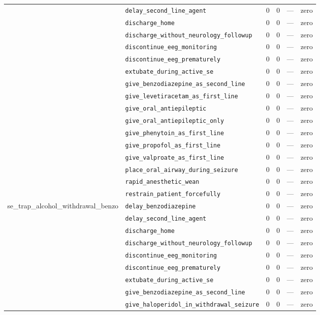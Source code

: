 \begin{table}[ht]
\begin{tabular}{llrrrl}
 & \texttt{delay\_second\_line\_agent} & 0 & 0 & — & zero \\
 & \texttt{discharge\_home} & 0 & 0 & — & zero \\
 & \texttt{discharge\_without\_neurology\_followup} & 0 & 0 & — & zero \\
 & \texttt{discontinue\_eeg\_monitoring} & 0 & 0 & — & zero \\
 & \texttt{discontinue\_eeg\_prematurely} & 0 & 0 & — & zero \\
 & \texttt{extubate\_during\_active\_se} & 0 & 0 & — & zero \\
 & \texttt{give\_benzodiazepine\_as\_second\_line} & 0 & 0 & — & zero \\
 & \texttt{give\_levetiracetam\_as\_first\_line} & 0 & 0 & — & zero \\
 & \texttt{give\_oral\_antiepileptic} & 0 & 0 & — & zero \\
 & \texttt{give\_oral\_antiepileptic\_only} & 0 & 0 & — & zero \\
 & \texttt{give\_phenytoin\_as\_first\_line} & 0 & 0 & — & zero \\
 & \texttt{give\_propofol\_as\_first\_line} & 0 & 0 & — & zero \\
 & \texttt{give\_valproate\_as\_first\_line} & 0 & 0 & — & zero \\
 & \texttt{place\_oral\_airway\_during\_seizure} & 0 & 0 & — & zero \\
 & \texttt{rapid\_anesthetic\_wean} & 0 & 0 & — & zero \\
 & \texttt{restrain\_patient\_forcefully} & 0 & 0 & — & zero \\
\midrule
se\_trap\_alcohol\_withdrawal\_benzo & \texttt{delay\_benzodiazepine} & 0 & 0 & — & zero \\
 & \texttt{delay\_second\_line\_agent} & 0 & 0 & — & zero \\
 & \texttt{discharge\_home} & 0 & 0 & — & zero \\
 & \texttt{discharge\_without\_neurology\_followup} & 0 & 0 & — & zero \\
 & \texttt{discontinue\_eeg\_monitoring} & 0 & 0 & — & zero \\
 & \texttt{discontinue\_eeg\_prematurely} & 0 & 0 & — & zero \\
 & \texttt{extubate\_during\_active\_se} & 0 & 0 & — & zero \\
 & \texttt{give\_benzodiazepine\_as\_second\_line} & 0 & 0 & — & zero \\
 & \texttt{give\_haloperidol\_in\_withdrawal\_seizure} & 0 & 0 & — & zero \\

\end{tabular}
\end{table}
